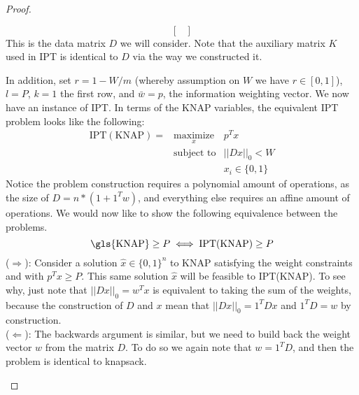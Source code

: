 \documentclass[12pt]{article}
\newcommand{\priv}{\text{IPT}}
\begin{document}
\begin{proof}
\begin{enumerate}
\begin{enumerate}
\[\begin{bmatrix}
            \end{bmatrix}\]
            This is the data matrix $D$ we will consider. Note that the auxiliary matrix $K$ used in \gls{IPT} is identical to $D$ via the way we constructed it.
        \end{enumerate}
        In addition, set $r = 1 - W/m$ (whereby assumption on $W$ we have $r \in [0,1]$), $l = P$, $k = 1$ the first row, and $\bar{w} = p$, the information weighting vector. We now have an instance of \gls{IPT}. In terms of the \gls{KNAP} variables, the equivalent \gls{IPT} problem looks like the following:
        \begin{equation}
            \begin{array}{lll}
                \priv(\text{KNAP}) = & \underset{x}{\text{maximize}} & p^T x \\
                & \mbox{subject to} & ||D x||_{0}  < W \\
                && x_i \in \{0,1\}
                \end{array}
        \end{equation}
        Notice the problem construction requires a polynomial amount of operations, as the size of $D = n * (1+ 1^T w)$, and everything else requires an affine amount of operations.
        We would now like to show the following equivalence between the problems. 
        \[\text{\gls{KNAP}} \geq P \iff \text{IPT(KNAP)} \geq P\]
       (\underline{$\Longrightarrow$}): Consider a solution $\hat{x}\in \{0,1\}^n$ to \gls{KNAP} satisfying the weight constraints and with $p^Tx \geq P$. This same solution $\hat{x}$ will be feasible to IPT(KNAP). To see why, just note that $||Dx||_0 = w^Tx$ is equivalent to taking the sum of the weights, because the construction of $D$ and $x$ mean that $||Dx||_0 = 1^TDx$ and $1^TD = w$ by construction. \\
       (\underline{$\Longleftarrow$}): The backwards argument is similar, but we need to build back the weight vector $w$ from the matrix $D$. To do so we again note that $w = 1^TD$, and then the problem is identical to knapsack.
    \end{enumerate}
\end{proof}
\end{document}
